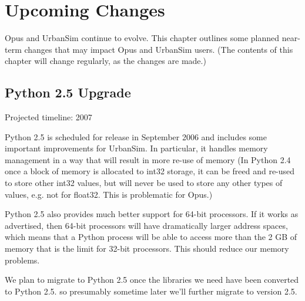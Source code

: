 

\chapter{Upcoming Changes}

Opus and UrbanSim continue to evolve.  This chapter outlines some planned
near-term changes that may impact Opus and UrbanSim users.  (The contents
of this chapter will change regularly, as the changes are made.)

\section{Python 2.5 Upgrade}

Projected timeline: 2007

Python 2.5 \pythonversionindex is scheduled for release in September 2006 and
includes some important improvements for UrbanSim.  In particular, it handles
memory management in a way that will result in more re-use of memory (In Python
2.4 once a block of memory is allocated to int32 storage, it can be freed and
re-used to store other int32 values, but will never be used to store any other
types of values, e.g. not for float32.  This is problematic for Opus.) 

Python 2.5 also provides much better support for 64-bit processors.  If it
works as advertised, then 64-bit processors will have dramatically larger
address spaces, which means that a Python process will be able to access
more than the 2 GB of memory that is the limit for 32-bit processors.  This
should reduce our memory problems.

We plan to migrate to Python 2.5 once the libraries we need have been
converted to Python 2.5.  so presumably sometime later we'll further
migrate to version 2.5. \pythonversionindex